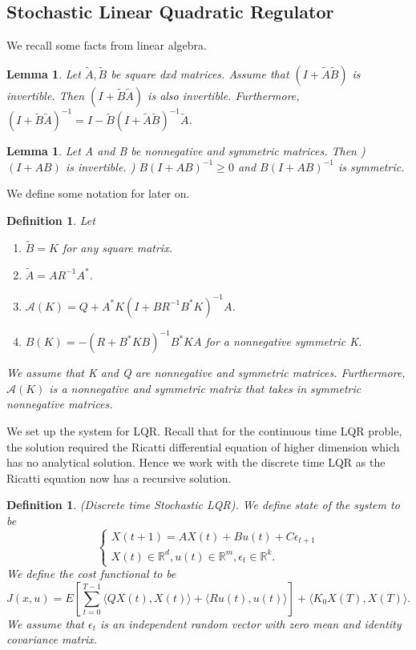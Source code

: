 \documentclass[twoside]{article}
\newtheorem{lemma}[theorem]{Lemma}
\newtheorem{definition}[theorem]{Definition}
\begin{document}
\subsection{Stochastic Linear Quadratic Regulator}

We recall some facts from linear algebra.

\begin{lemma}Let $\tilde{A}, \tilde{B}$ be square dxd matrices. Assume that $(I + \tilde{A}\tilde{B})$ is invertible. Then $(I + \tilde{B}\tilde{A})$ is also invertible.
\newline
Furthermore, $(I + \tilde{B}\tilde{A})^{-1} = I - \tilde{B}(I + \tilde{A}\tilde{B})^{-1}\tilde{A}$.
\end{lemma}
\begin{lemma}Let A and B be nonnegative and symmetric matrices. Then
) $(I+AB)$ is invertible.
) $B(I + AB)^{-1} \geq 0$  and $B(I + AB)^{-1}$ is symmetric.
\end{lemma}

We define some notation for later on.
\begin{definition}
Let 
\begin{enumerate}
\item $\tilde{B} = K$ for any square matrix.
\item $\tilde{A} = AR^{-1}A^*$.
\item $\mathcal{A}(K) = Q + A^*K(I + BR^{-1}B^*K)^{-1}A$.
\item $B(K) = -(R + B^*KB)^{-1}B^*KA$ for a nonnegative symmetric K.
\end{enumerate}

We assume that K and Q are nonnegative and symmetric matrices. Furthermore, $\mathcal{A}(K)$ is a nonnegative and symmetric matrix that takes in symmetric nonnegative matrices.
\end{definition}

We set up the system for LQR. Recall that for the continuous time LQR proble, the solution required the Ricatti differential equation of higher dimension which has no analytical solution. Hence we work with the discrete time LQR as the Ricatti equation now has a recursive solution.
\begin{definition}(Discrete time Stochastic LQR). We define state of the system to be
$$
\begin{cases}
X(t+1) = AX(t) + Bu(t) + C\epsilon_{t+1}\\
X(t) \in \mathbb{R}^d, u(t) \in \mathbb{R}^m, \epsilon_t \in \mathbb{R}^k.
\end{cases}
$$
\newline
We define the cost functional to be 
$$
J(x,u) = E[\sum_{t=0}^{T-1}\langle QX(t),X(t)\rangle + \langle Ru(t), u(t) \rangle] + \langle K_0X(T), X(T) \rangle.
$$
We assume that $\epsilon_t$ is an independent random vector with zero mean and identity covariance matrix. 
\end{definition}
\end{document}
